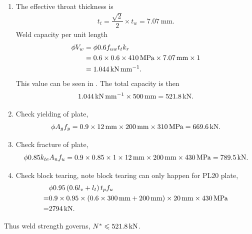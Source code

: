\begin{solution}
\begin{enumerate}
\item
The effective throat thickness is
\begin{gather*}
t_t=\dfrac{\sqrt{2}}{2}\times{}t_w=\SI{7.07}{\mm}.
\end{gather*}
Weld capacity per unit length
\begin{align*}
\phi{}V_w&=\phi{}0.6f_{uw}t_tk_r\\
&=0.6\times0.6\times\SI{410}{\mega\pascal}\times\SI{7.07}{\milli\meter}\times1\\
&=\SI{1.044}{\kilo\newton\per\milli\meter}.
\end{align*}
This value can be seen in . The total capacity is then
\begin{gather*}
\SI{1.044}{\kilo\newton\per\milli\meter}\times\SI{500}{\milli\meter}=\SI{521.8}{\kilo\newton}.
\end{gather*}
\item
Check yielding of plate,
\begin{gather*}
\phi{}A_gf_y=0.9\times\SI{12}{\milli\meter}\times\SI{200}{\milli\meter}\times\SI{310}{\mega\pascal}=\SI{669.6}{\kilo\newton}.
\end{gather*}
\item
Check fracture of plate,
\begin{gather*}
\phi0.85k_{te}A_nf_u=0.9\times0.85\times1\times\SI{12}{\milli\meter}\times\SI{200}{\milli\meter}\times\SI{430}{\mega\pascal}=\SI{789.5}{\kilo\newton}.
\end{gather*}
\item
Check block tearing, note block tearing can only happen for PL20 plate,
\begin{align*}
&\phi0.95\left(0.6l_{v}+l_{t}\right)t_pf_u\\=&0.9\times0.95\times\left(0.6\times\SI{300}{\milli\meter}+\SI{200}{\milli\meter}\right)\times\SI{20}{\milli\meter}\times\SI{430}{\mega\pascal}\\
=&\SI{2794}{\kilo\newton}.
\end{align*}
\end{enumerate}
Thus weld strength governs, $N^*\leqslant\SI{521.8}{\kilo\newton}$.
\end{solution}

